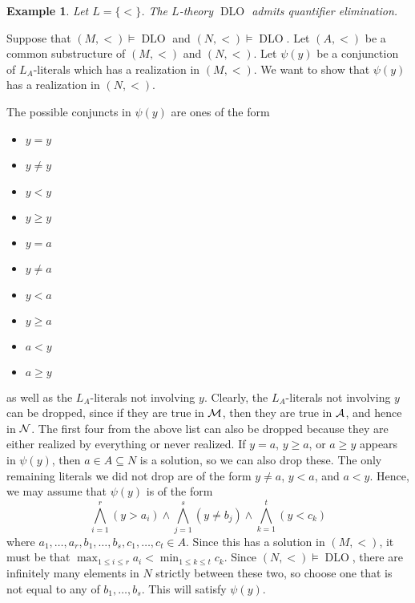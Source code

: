 \documentclass[10pt]{article}
\makeatletter
\DeclareMathOperator{\DLO}{DLO}
\theoremstyle{newstyle}
\newtheorem{exmp}[thm]{Example}
\newenvironment{pf}[1][\proofname]{\par
  \pushQED{\qed}%
  \normalfont \topsep0\p@\relax
  \trivlist
  \item[\hskip\labelsep\scshape
  #1\@addpunct{.}]\ignorespaces
}{%
  \popQED\endtrivlist\@endpefalse
}
\makeatother
\begin{document}
\begin{exmp}
Let $L = \{<\}$. The $L$-theory $\DLO$ admits quantifier elimination. 
\end{exmp}
\begin{pf}
Suppose that $(M, <) \vDash \DLO$ and $(N, <) \vDash \DLO$. Let 
$(A, <)$ be a common substructure of $(M, <)$ and $(N, <)$. 
Let $\psi(y)$ be a conjunction of $L_A$-literals which has a realization in $(M, <)$. 
We want to show that $\psi(y)$ has a realization in $(N, <)$. 

The possible conjuncts in $\psi(y)$ are ones of the form\vspace{-1ex}
\begin{multicols}{3}
    \begin{itemize}
        \item $y = y$
        \item $y \neq y$
        \item $y < y$
        \item $y \geq y$
        \item $y = a$
        \item $y \neq a$
        \item $y < a$
        \item $y \geq a$
        \item $a < y$
        \item $a \geq y$
    \end{itemize}
\end{multicols}\vspace{-2ex}
as well as the $L_A$-literals not involving $y$. Clearly, the $L_A$-literals not involving $y$ 
can be dropped, since if they are true in ${\cal M}$, then they are true in ${\cal A}$, 
and hence in ${\cal N}$. The first four from the above list can also be dropped 
because they are either realized by everything or never realized. 
If $y = a$, $y \geq a$, or $a \geq y$ appears in $\psi(y)$, then $a \in A \subseteq N$ is a solution, so we can also drop these. The only remaining literals we did not drop are of the form 
$y \neq a$, $y < a$, and $a < y$. Hence, we may assume that $\psi(y)$ is of the form 
\[ \bigwedge_{i=1}^r (y > a_i) \wedge \bigwedge_{j=1}^s (y \neq b_j) \wedge 
\bigwedge_{k=1}^t (y < c_k) \]
where $a_1, \dots, a_r, b_1, \dots, b_s, c_1, \dots, c_t \in A$. Since this has a solution in 
$(M, <)$, it must be that $\max_{1\leq i \leq r} a_i < \min_{1 \leq k \leq t} c_k$. 
Since $(N, <) \vDash \DLO$, there are infinitely many elements in $N$ strictly between these 
two, so choose one that is not equal to any of $b_1, \dots, b_s$. This will satisfy $\psi(y)$.
\end{pf}
\end{document}
